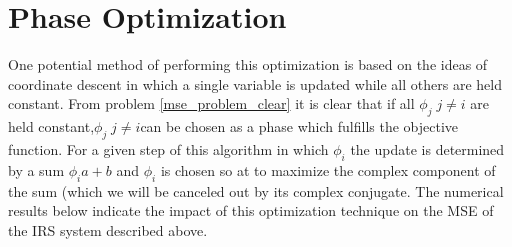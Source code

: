 \documentclass[12pt,a4paper]{report}
\begin{document}
\section{Phase Optimization}
One potential method of performing this optimization is based on the ideas of coordinate descent in which a single variable is updated while all others are held constant.
From problem \eqref{mse_problem_clear} it is clear that if all $\phi_{j} \; j \neq i $ are held constant,$\phi_{j} \; j \neq i $can be chosen as a phase which fulfills the objective function. 
For a given step of this algorithm in which $\phi_{i}$ the update is determined by a sum $\phi_{i}a + b$ and $\phi_{i}$ is chosen so at to maximize the 
complex component of the sum (which we will be canceled out by its complex conjugate.
The numerical results below indicate the impact of this optimization technique on the MSE of the IRS system described above. 

\end{document}
